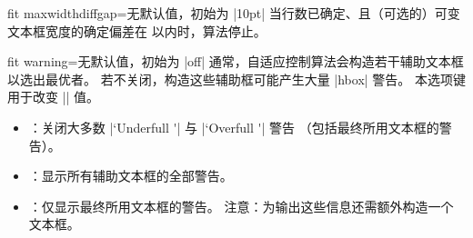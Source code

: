 \begin{docTcbKey}{fit maxwidthdiffgap}{=}{无默认值，初始为 |10pt|}
  当行数已确定、且（可选的）可变文本框宽度的确定偏差在  以内时，算法停止。
\end{docTcbKey}


\begin{docTcbKey}{fit warning}{=}{无默认值，初始为 |off|}
  通常，自适应控制算法会构造若干辅助文本框以选出最优者。
  若不关闭，构造这些辅助框可能产生大量 |hbox| 警告。
  本选项键用于改变 |\hbadness| 值。
  \begin{itemize}
  \item{}：关闭大多数 |`Underfull \hbox'| 与 |`Overfull \hbox'| 警告
    （包括最终所用文本框的警告）。
  \item{}：显示所有辅助文本框的全部警告。
  \item{}：仅显示最终所用文本框的警告。
    注意：为输出这些信息还需额外构造一个文本框。
  \end{itemize}
\end{docTcbKey}

